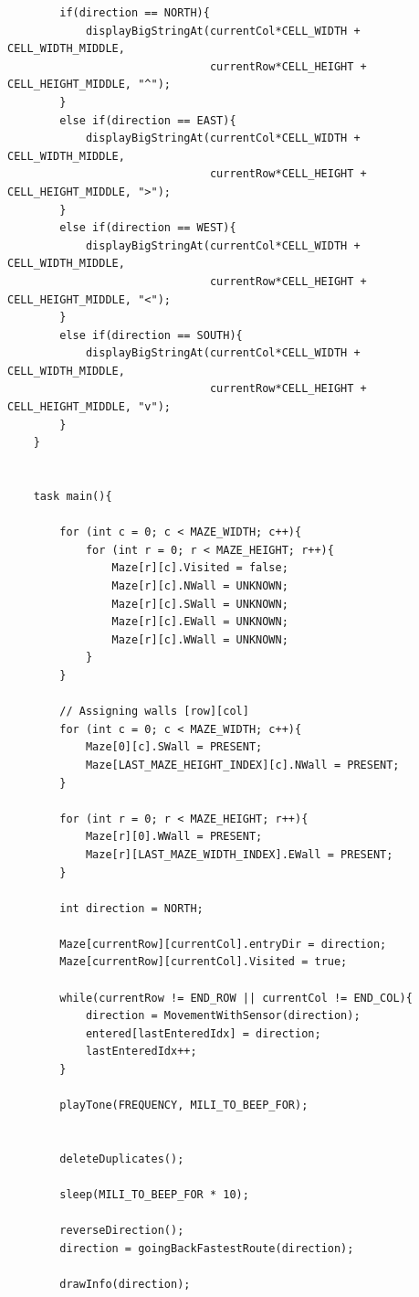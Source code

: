\documentclass[11pt]{article}
\begin{document}
\begin{linenumbers}
\begin{verbatim}
        if(direction == NORTH){
            displayBigStringAt(currentCol*CELL_WIDTH + CELL_WIDTH_MIDDLE, 
                               currentRow*CELL_HEIGHT + CELL_HEIGHT_MIDDLE, "^");
        }
        else if(direction == EAST){
            displayBigStringAt(currentCol*CELL_WIDTH + CELL_WIDTH_MIDDLE,
                               currentRow*CELL_HEIGHT + CELL_HEIGHT_MIDDLE, ">");
        }
        else if(direction == WEST){
            displayBigStringAt(currentCol*CELL_WIDTH + CELL_WIDTH_MIDDLE,
                               currentRow*CELL_HEIGHT + CELL_HEIGHT_MIDDLE, "<");
        }
        else if(direction == SOUTH){
            displayBigStringAt(currentCol*CELL_WIDTH + CELL_WIDTH_MIDDLE,
                               currentRow*CELL_HEIGHT + CELL_HEIGHT_MIDDLE, "v");
        }
    }


    task main(){

        for (int c = 0; c < MAZE_WIDTH; c++){
            for (int r = 0; r < MAZE_HEIGHT; r++){
                Maze[r][c].Visited = false;
                Maze[r][c].NWall = UNKNOWN;
                Maze[r][c].SWall = UNKNOWN;
                Maze[r][c].EWall = UNKNOWN;
                Maze[r][c].WWall = UNKNOWN;
            }
        }

        // Assigning walls [row][col]
        for (int c = 0; c < MAZE_WIDTH; c++){
            Maze[0][c].SWall = PRESENT;
            Maze[LAST_MAZE_HEIGHT_INDEX][c].NWall = PRESENT;
        }

        for (int r = 0; r < MAZE_HEIGHT; r++){
            Maze[r][0].WWall = PRESENT;
            Maze[r][LAST_MAZE_WIDTH_INDEX].EWall = PRESENT;
        }

        int direction = NORTH;

        Maze[currentRow][currentCol].entryDir = direction;
        Maze[currentRow][currentCol].Visited = true;

        while(currentRow != END_ROW || currentCol != END_COL){
            direction = MovementWithSensor(direction);
            entered[lastEnteredIdx] = direction;
            lastEnteredIdx++;
        }

        playTone(FREQUENCY, MILI_TO_BEEP_FOR);


        deleteDuplicates();

        sleep(MILI_TO_BEEP_FOR * 10);

        reverseDirection();
        direction = goingBackFastestRoute(direction);

        drawInfo(direction);


\end{verbatim}
\end{linenumbers}
\end{document}
